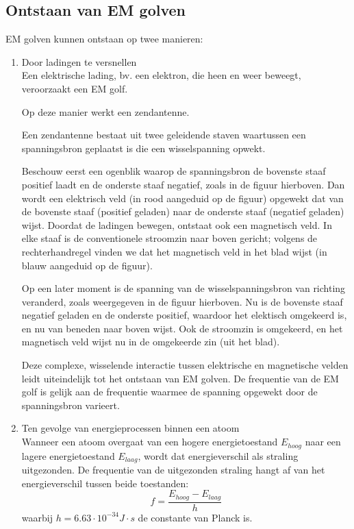  \subsection{Ontstaan van EM golven}
 EM golven kunnen ontstaan op twee manieren:
 \begin{enumerate}
     \item Door ladingen te versnellen \\
     Een elektrische lading, bv. een elektron, die heen en weer beweegt, veroorzaakt een EM golf.
    
     Op deze manier werkt een zendantenne.
    
     Een zendantenne bestaat uit twee geleidende staven waartussen een spanningsbron geplaatst is die een wisselspanning opwekt. 
    
    
     Beschouw eerst een ogenblik waarop de spanningsbron de bovenste staaf positief laadt en de onderste staaf negatief, zoals in de figuur hierboven. Dan wordt een elektrisch veld (in rood aangeduid op de figuur) opgewekt dat van de bovenste staaf (positief geladen) naar de onderste staaf (negatief geladen) wijst. Doordat de ladingen bewegen, ontstaat ook een magnetisch veld. In elke staaf is de conventionele stroomzin naar boven gericht; volgens de rechterhandregel vinden we dat het magnetisch veld in het blad wijst (in blauw aangeduid op de figuur).
    
    
     Op een later moment is de spanning van de wisselspanningsbron van richting veranderd, zoals weergegeven in de figuur hierboven. Nu is de bovenste staaf negatief geladen en de onderste positief, waardoor het elektisch omgekeerd is, en nu van beneden naar boven wijst. Ook de stroomzin is omgekeerd, en het magnetisch veld wijst nu in de omgekeerde zin (uit het blad).
    
     Deze complexe, wisselende interactie tussen elektrische en magnetische velden leidt uiteindelijk tot het ontstaan van EM golven. De frequentie van de EM golf is gelijk aan de frequentie waarmee de spanning opgewekt door de spanningsbron varieert.
    
     \item Ten gevolge van energieprocessen binnen een atoom \\
     Wanneer een atoom overgaat van een hogere energietoestand $E_{hoog}$ naar een lagere energietoestand $E_{laag}$, wordt dat energieverschil als straling uitgezonden. De frequentie van de uitgezonden straling hangt af van het energieverschil tussen beide toestanden:
     \begin{equation}
         f = \frac{E_{hoog}-E_{laag}}{h}
     \end{equation}
     waarbij $h=6.63 \cdot 10^{-34} J \cdot s$ de constante van Planck is.
 \end{enumerate}

